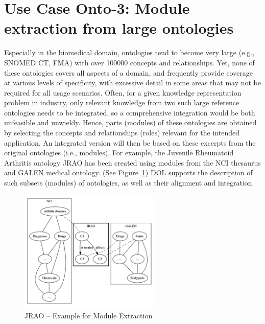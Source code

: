 \documentclass[10pt,%
\ifpretendfinal
final%
\else
draft%
\fi,
]{scrreprt}
\newcommand{\figurerefname}{Figure}
\newcommand{\fref}[1]{\figurerefname~\ref{#1}}
\begin{document}
\section{Use Case Onto-3: Module extraction from large ontologies}
Especially in the biomedical domain, ontologies tend to become very large (e.g., SNOMED CT, FMA) 
with over 100000 concepts and relationships. Yet, none of these ontologies covers all aspects of a 
domain, and frequently provide coverage at various levels of specificity, with excessive detail in 
some areas that may not be required for all usage scenarios. Often, for a given knowledge 
representation problem in industry, only relevant knowledge from two such large reference 
ontologies needs to be integrated, so a comprehensive integration would be both unfeasible and 
unwieldy. Hence, parts (modules) of these ontologies are obtained by selecting the concepts and 
relationships (roles) relevant for the intended application. An integrated version will then be 
based on these excerpts from the original ontologies (i.e., modules). For example, the Juvenile 
Rheumatoid Arthritis ontology JRAO has been created using modules from the NCI thesaurus and GALEN 
medical ontology. (See \fref{JRAO}) DOL  
supports the description of such subsets (modules) of ontologies, as well as their alignment and 
integration.


\begin{figure}[htbp]
\begin{center}
\includegraphics[width=0.6\textwidth]{useCaseOnto3.png}
\caption{JRAO  -- Example for Module Extraction}
\label{JRAO}
\end{center}
\end{figure}

 
\end{document}
